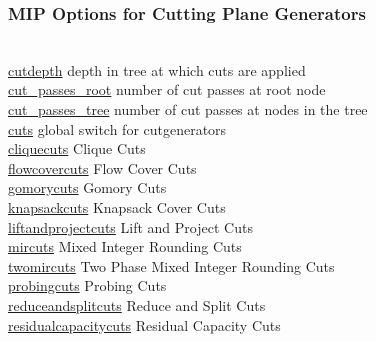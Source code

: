 \subsubsection{MIP Options for Cutting Plane Generators}
\begin{tabbing}
\hspace {1.3in} \= \\
\hyperlink{cutdepth}
{cutdepth} \> depth in tree at which cuts are applied \\
\hyperlink{cut_passes_root}
{cut\_passes\_root} \> number of cut passes at root node \\
\hyperlink{cut_passes_tree}
{cut\_passes\_tree} \> number of cut passes at nodes in the tree \\
\hyperlink{cuts}
{cuts} \> global switch for cutgenerators \\
\hyperlink{cliquecuts}
{cliquecuts} \> Clique Cuts \\
\hyperlink{flowcovercuts}
{flowcovercuts} \> Flow Cover Cuts \\
\hyperlink{gomorycuts}
{gomorycuts} \> Gomory Cuts \\
\hyperlink{knapsackcuts}
{knapsackcuts} \> Knapsack Cover Cuts \\
\hyperlink{liftandprojectcuts}
{liftandprojectcuts} \> Lift and Project Cuts \\
\hyperlink{mircuts}
{mircuts} \> Mixed Integer Rounding Cuts \\
\hyperlink{twomircuts}
{twomircuts} \> Two Phase Mixed Integer Rounding Cuts \\
\hyperlink{probingcuts}
{probingcuts} \> Probing Cuts \\
\hyperlink{reduceandsplitcuts}
{reduceandsplitcuts} \> Reduce and Split Cuts \\
\hyperlink{residualcapacitycuts}
{residualcapacitycuts} \> Residual Capacity Cuts
\end{tabbing}


